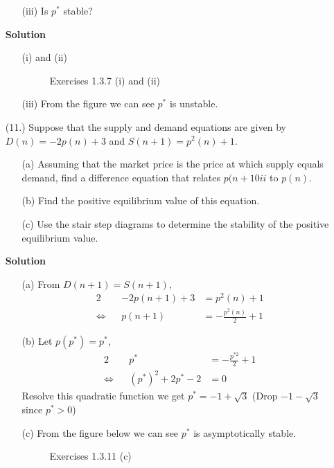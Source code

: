 \begin{enumerate}
\begin{itemize}
            \item[(iii)] Is $p^*$ stable?
        \end{itemize}
        \textbf{Solution}
        \begin{itemize}
            \item[(i) and (ii)]
                \begin{figure}[H]
                    \centering
                    \caption{Exercises 1.3.7 (i) and (ii)}
                    \label{fig:exercises-1.3.7-i&ii}
                \end{figure}
            \item[(iii)] From the figure we can see $p^*$ is unstable.
        \end{itemize}
    \item[(11.)] Suppose that the supply and demand equations are given by $D(n)=-2p(n)+3$ and $S(n+1)=p^2(n)+1$.
        \begin{itemize}
            \item[(a)] Assuming that the market price is the price at which supply equals demand, find a difference equation that relates $p(n+10ii$ to $p(n)$.
            \item[(b)] Find the positive equilibrium value of this equation.
            \item[(c)] Use the stair step diagrams to determine the stability of the positive equilibrium value.
        \end{itemize}
        \textbf{Solution}
        \begin{itemize}
            \item[(a)] From $D(n+1)=S(n+1)$,
                \begin{alignat*}{2}
                    && -2p(n+1)+3 & =p^2(n)+1 \\
                    \Leftrightarrow && p(n+1) & =-\frac{p^2(n)}{2}+1
                \end{alignat*}
            \item[(b)] Let $p(p^*)=p^*$,
                \begin{alignat*}{2}
                    && p^* & =-\frac{p^{*2}}{2}+1 \\
                    \Leftrightarrow && (p^*)^2+2p^*-2 & =0
                \end{alignat*}
                Resolve this quadratic function we get $p^*=-1+\sqrt{3}$ (Drop $-1-\sqrt{3}$ since $p^*>0$)
            \item[(c)] From the figure below we can see $p^*$ is asymptotically stable.
                \begin{figure}[H]
                    \centering
                    \caption{Exercises 1.3.11 (c)}
                    \label{fig:exercises-1.3.11.c}
                \end{figure}
        \end{itemize}
\end{enumerate}

